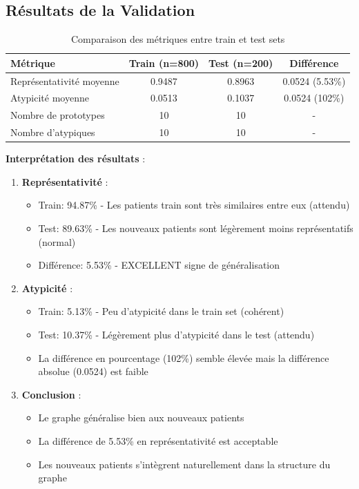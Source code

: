 \documentclass[12pt,a4paper]{article}
\begin{document}
\subsection{Résultats de la Validation}

\begin{table}[H]
\centering
\begin{tabular}{lccc}
\toprule
\textbf{Métrique} & \textbf{Train (n=800)} & \textbf{Test (n=200)} & \textbf{Différence} \\
\midrule
Représentativité moyenne & 0.9487 & 0.8963 & 0.0524 (5.53\%) \\
Atypicité moyenne & 0.0513 & 0.1037 & 0.0524 (102\%) \\
Nombre de prototypes & 10 & 10 & - \\
Nombre d'atypiques & 10 & 10 & - \\
\bottomrule
\end{tabular}
\caption{Comparaison des métriques entre train et test sets}
\end{table}

\textbf{Interprétation des résultats} :

\begin{enumerate}
    \item \textbf{Représentativité} :
    \begin{itemize}
        \item Train: 94.87\% - Les patients train sont très similaires entre eux (attendu)
        \item Test: 89.63\% - Les nouveaux patients sont légèrement moins représentatifs (normal)
        \item Différence: 5.53\% - EXCELLENT signe de généralisation
    \end{itemize}

    \item \textbf{Atypicité} :
    \begin{itemize}
        \item Train: 5.13\% - Peu d'atypicité dans le train set (cohérent)
        \item Test: 10.37\% - Légèrement plus d'atypicité dans le test (attendu)
        \item La différence en pourcentage (102\%) semble élevée mais la différence absolue (0.0524) est faible
    \end{itemize}

    \item \textbf{Conclusion} :
    \begin{itemize}
        \item Le graphe généralise bien aux nouveaux patients
        \item La différence de 5.53\% en représentativité est acceptable
        \item Les nouveaux patients s'intègrent naturellement dans la structure du graphe
    \end{itemize}
\end{enumerate}
\end{document}
